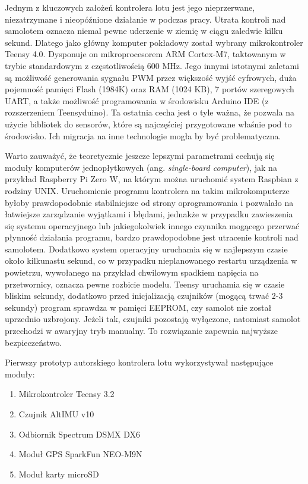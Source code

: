 \documentclass[12pt, a4paper]{article}
\begin{document}
Jednym z kluczowych założeń kontrolera lotu jest jego nieprzerwane, niezatrzymane i nieopóźnione działanie w podczas pracy. Utrata kontroli nad samolotem oznacza niemal pewne uderzenie w ziemię w ciągu zaledwie kilku sekund. Dlatego jako główny komputer pokładowy został wybrany mikrokontroler Teensy 4.0. Dysponuje on mikroprocesorem ARM Cortex-M7, taktowanym w trybie standardowym z częstotliwością 600 MHz. Jego innymi istotnymi zaletami są możliwość generowania sygnału PWM przez większość wyjść cyfrowych, duża pojemność pamięci Flash (1984K) oraz RAM (1024 KB), 7 portów szeregowych UART, a także możliwość programowania w środowisku Arduino IDE (z rozszerzeniem Teensyduino). Ta ostatnia cecha jest o tyle ważna, że pozwala na użycie bibliotek do sensorów, które są najczęściej przygotowane właśnie pod to środowisko. Ich migracja na inne technologie mogła by być problematyczna. 

Warto zauważyć, że teoretycznie jeszcze lepszymi parametrami cechują się moduły komputerów jednopłytkowych (ang. \textit{single-board computer}), jak na przykład Raspberry Pi Zero W, na którym można uruchomić system Raspbian z rodziny UNIX. Uruchomienie programu kontrolera na takim mikrokomputerze byłoby prawdopodobnie stabilniejsze od strony oprogramowania i pozwalało na łatwiejsze zarządzanie wyjątkami i błędami, jednakże w przypadku zawieszenia się systemu operacyjnego lub jakiegokolwiek innego czynnika mogącego przerwać płynność działania programu, bardzo prawdopodobne jest utracenie kontroli nad samolotem. Dodatkowo system operacyjny uruchamia się w najlepszym czasie około kilkunastu sekund, co w przypadku nieplanowanego restartu urządzenia w powietrzu, wywołanego na przykład chwilowym spadkiem napięcia na przetwornicy, oznacza pewne rozbicie modelu. Teensy uruchamia się w czasie bliskim sekundy, dodatkowo przed inicjalizacją czujników (mogącą trwać 2-3 sekundy) program sprawdza w pamięci EEPROM, czy samolot nie został uprzednio uzbrojony. Jeżeli tak, czujniki pozostają wyłączone, natomiast samolot przechodzi w awaryjny tryb manualny. To rozwiązanie zapewnia najwyższe bezpieczeństwo.

Pierwszy prototyp autorskiego kontrolera lotu wykorzystywał następujące moduły:
\begin{enumerate}
\item Mikrokontroler Teensy 3.2
\item Czujnik AltIMU v10
\item Odbiornik Spectrum DSMX DX6
\item Moduł GPS SparkFun NEO-M9N
\item Moduł karty microSD
\end{enumerate}
\end{document}
